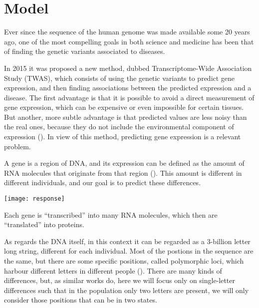 \documentclass[../main.tex]{subfiles}
\begin{document}
\section{Model}

Ever since the sequence of the human genome was made available some 20 
years ago,  one of the most 
compelling goals in both science and medicine has been that of finding 
the genetic variants associated to diseases.


In 2015 it was proposed a new method, 
 dubbed Transcriptome-Wide 
Association Study (TWAS), which consists of using the genetic variants 
to predict gene expression, and then finding associations between the 
predicted expression and a disease. The first advantage is that it is 
possible to avoid a direct measurement of gene expression, which can be 
expensive or even impossible for certain tissues. But another, more 
subtle advantage is that predicted values are less noisy than the real 
ones, because they do not include the environmental component of 
expression (). In view of this method, predicting gene 
expression is a relevant problem.

A gene is a region of DNA, and its expression can be defined as the 
amount of RNA molecules that originate from that region 
(). This amount is different in different individuals, 
and our goal is to predict these differences.

\begin{marginfigure}[-3.8cm]
  \texttt{[image: response]}
  \caption{Each gene is \enquote{transcribed} into many RNA molecules, 
which then are \enquote{translated} into proteins.}
\end{marginfigure}

As regards the DNA itself, in this context it can be regarded as a 
3-billion letter long string, different for each individual. Most of the 
postions in the sequence are the same, but there are some specific 
positions, called polymorphic loci, which harbour different letters in 
different people (). There are many kinds of 
differences, but, as similar works do, 
 here we will focus only on 
single-letter differences such that in the population only two letters 
are present, \ie we will only consider those positions that can be in 
two states.
\end{document}
